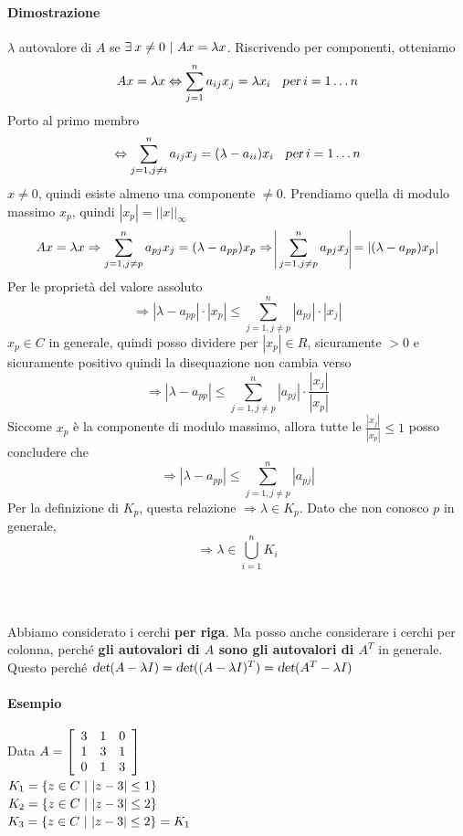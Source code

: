 \documentclass[10pt]{book}
\begin{document}
\paragraph{Dimostrazione} $\lambda$ autovalore di $A$ se $\exists\:x \neq 0 \:\:\vline\:\: Ax = \lambda x$. Riscrivendo per componenti, otteniamo
$$Ax = \lambda x \Leftrightarrow \sum_{j = 1}^n a_{ij}x_j = \lambda x_i\:\:\:\:\textsl{per}\:i = 1\ldots n$$
Porto al primo membro
$$\Leftrightarrow  \sum_{j = 1, j \neq i}^n a_{ij}x_j = (\lambda - a_{ii})x_i\:\:\:\:\textsl{per}\:i = 1\ldots n$$
$x \neq 0$, quindi esiste almeno una componente $\neq 0$. Prendiamo quella di modulo massimo $x_p$, quindi $|x_p| = ||x||_\infty$
$$Ax = \lambda x \Rightarrow \sum_{j = 1, j \neq p}^n a_{pj}x_j = (\lambda - a_{pp})x_p \Rightarrow\:\vline\sum_{j = 1, j \neq p}^n a_{pj}x_j\vline = |(\lambda - a_{pp})x_p|$$
Per le proprietà del valore assoluto
$$\Rightarrow |\lambda - a_{pp}|\cdot|x_p| \leq \sum_{j = 1, j \neq p}^n |a_{pj}|\cdot |x_j| $$
$x_p \in C$ in generale, quindi posso dividere per $|x_p| \in R$, sicuramente $> 0$ e sicuramente positivo quindi la disequazione non cambia verso
$$\Rightarrow |\lambda - a_{pp}| \leq \sum_{j = 1, j \neq p}^n |a_{pj}|\cdot \frac{|x_j|}{|x_p|} $$
Siccome $x_p$ è la componente di modulo massimo, allora tutte le $\frac{|x_j|}{|x_p|} \leq 1$ posso concludere che
$$\Rightarrow |\lambda - a_{pp}| \leq \sum_{j = 1, j \neq p}^n |a_{pj}|$$
Per la definizione di $K_p$, questa relazione $\Rightarrow \lambda \in K_p$. Dato che non conosco $p$ in generale, $$\Rightarrow \lambda \in \bigcup_{i = 1}^n K_i$$\\\\\\
Abbiamo considerato i cerchi \textbf{per riga}. Ma posso anche considerare i cerchi per colonna, perché \textbf{gli autovalori di $A$ sono gli autovalori di $A^T$} in generale.\\
Questo perché $\textsl{det}(A - \lambda I) = \textsl{det}((A - \lambda I)^T) = \textsl{det}(A^T - \lambda I)$
\paragraph{Esempio} Data \begin{math}
A = \left[ 
	\begin{array}{c c c}
		3 & 1 & 0\\
		1 & 3 & 1\\
		0 & 1 & 3
	\end{array}
	\right]
\end{math}\\
$K_1 = \left\{ z \in C \:\:\vline\:\: |z - 3| \leq 1\right\}$\\
$K_2 = \left\{ z \in C \:\:\vline\:\: |z - 3| \leq 2\right\}$\\
$K_3 = \left\{ z \in C \:\:\vline\:\: |z - 3| \leq 2\right\} = K_1$
\end{document}
